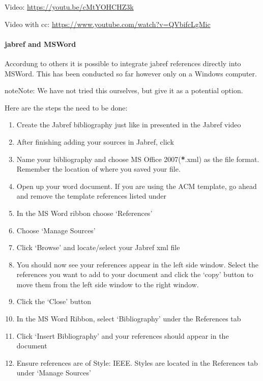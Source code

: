 Video: \url{https://youtu.be/cMtYOHCHZ3k}

Video with cc: \url{https://www.youtube.com/watch?v=QVbifcLgMic}


\paragraph{jabref and MSWord}
\label{\detokenize{lesson/doc/latex:jabref-and-msword}}
Accordung to others it is possible to integrate jabref
references directly into MSWord. This has been conducted so far
however only on a Windows computer.

\begin{sphinxadmonition}{note}{Note:}
We have not tried this ourselves, but give it as a potential
option.
\end{sphinxadmonition}

Here are the steps the need to be done:
\begin{enumerate}
\item {} 
Create the Jabref bibliography just like in presented in the Jabref video

\item {} 
After finishing adding your sources in Jabref, click 

\item {} 
Name your bibliography and choose MS Office 2007({\color{red}\bfseries{}*}.xml) as the file
format. Remember the location of where you saved your file.

\item {} 
Open up your word document.  If you are using the ACM template, go
ahead and remove the template references listed under

\item {} 
In the MS Word ribbon choose `References'

\item {} 
Choose `Manage Sources'

\item {} 
Click `Browse' and locate/select your Jabref xml file

\item {} 
You should now see your references appear in the left side window.
Select the references you want to add to your document and click
the `copy' button to move them from the left side window to the
right window.

\item {} 
Click the `Close' button

\item {} 
In the MS Word Ribbon, select `Bibliography' under the References
tab

\item {} 
Click `Insert Bibliography' and your references should appear in
the document

\item {} 
Ensure references are of Style: IEEE.  Styles are located in the
References tab under `Manage Sources'

\end{enumerate}

